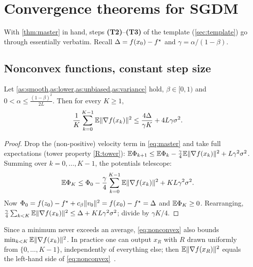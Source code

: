 \section{Convergence theorems for SGDM}\label{sec:convergence}

With \cref{thm:master} in hand, steps \textbf{(T2)}--\textbf{(T3)} of the template
(\cref{sec:template}) go through essentially verbatim. Recall $\Delta=f(x_0)-f^\star$ and
$\gamma=\alpha/(1-\beta)$.

\subsection{Nonconvex functions, constant step size}

\begin{tcolorbox}[keybox]
\begin{theorem}\label{thm:nonconvex}
Let \cref{as:smooth,as:lower,as:unbiased,as:variance} hold, $\beta\in[0,1)$ and
$0<\alpha\le\frac{(1-\beta)^2}{2L}$. Then for every $K\ge1$,
\begin{equation}\label{eq:nonconvex}
  \frac1K\sum_{k=0}^{K-1}\mathbb{E}\lVert \nabla f(x_k)\rVert^2\le\frac{4\Delta}{\gamma K}+4L\gamma\sigma^2 .
\end{equation}
\end{theorem}
\end{tcolorbox}

\begin{proof}
Drop the (non-positive) velocity term in \eqref{eq:master} and take full expectations
(tower property \ref{R:tower}):
$\mathbb{E}\Phi_{k+1}\le\mathbb{E}\Phi_k-\frac\gamma4\mathbb{E}\lVert \nabla f(x_k)\rVert^2+L\gamma^2\sigma^2$.
Summing over $k=0,\dots,K-1$, the potentials telescope:
\[
  \mathbb{E}\Phi_K\le\Phi_0-\frac\gamma4\sum_{k=0}^{K-1}\mathbb{E}\lVert \nabla f(x_k)\rVert^2+KL\gamma^2\sigma^2 .
\]
Now $\Phi_0=f(z_0)-f^\star+c_\beta\lVert v_0\rVert^2=f(x_0)-f^\star=\Delta$ and $\mathbb{E}\Phi_K\ge0$. Rearranging,
$\frac\gamma4\sum_{k<K}\mathbb{E}\lVert \nabla f(x_k)\rVert^2\le\Delta+KL\gamma^2\sigma^2$; divide by $\gamma K/4$.
\end{proof}

Since a minimum never exceeds an average, \eqref{eq:nonconvex} also bounds
$\min_{k<K}\mathbb{E}\lVert \nabla f(x_k)\rVert^2$. In practice one can output $x_R$ with $R$ drawn
uniformly from $\{0,\dots,K-1\}$, independently of everything else; then
$\mathbb{E}\lVert \nabla f(x_R)\rVert^2$ equals the left-hand side of \eqref{eq:nonconvex}~\cite{ghadimilan2013}.

